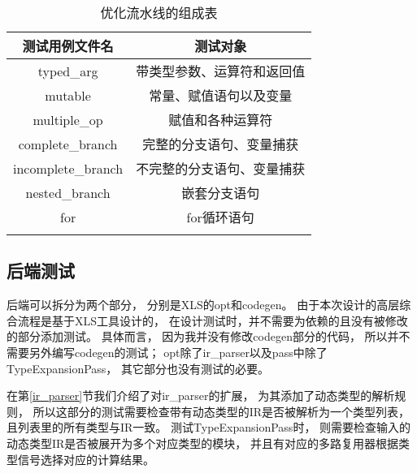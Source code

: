 \begin{table}[ht]
\begin{center}
\caption{优化流水线的组成表}

\begin{tabular}{ c c }
    \Xhline{3\arrayrulewidth}
    测试用例文件名        & 测试对象 \\
    \hline
    typed\_arg           & 带类型参数、运算符和返回值 \\
    mutable              & 常量、赋值语句以及变量 \\
    multiple\_op         & 赋值和各种运算符 \\
    complete\_branch     & 完整的分支语句、变量捕获 \\
    incomplete\_branch   & 不完整的分支语句、变量捕获 \\
    nested\_branch       & 嵌套分支语句 \\
    for                  & for循环语句 \\
    \Xhline{3\arrayrulewidth}
\end{tabular}

\label{table.2}
\end{center}
\end{table}

\subsection{后端测试}

后端可以拆分为两个部分，
分别是XLS的opt和codegen。
由于本次设计的高层综合流程是基于XLS工具设计的，
在设计测试时，并不需要为依赖的且没有被修改的部分添加测试。
具体而言，
因为我并没有修改codegen部分的代码，
所以并不需要另外编写codegen的测试；
opt除了ir\_parser以及pass中除了TypeExpansionPass，
其它部分也没有测试的必要。

在第\ref{ir_parser}节我们介绍了对ir\_parser的扩展，
为其添加了动态类型的解析规则，
所以这部分的测试需要检查带有动态类型的IR是否被解析为一个类型列表，
且列表里的所有类型与IR一致。
测试TypeExpansionPass时，
则需要检查输入的动态类型IR是否被展开为多个对应类型的模块，
并且有对应的多路复用器根据类型信号选择对应的计算结果。
